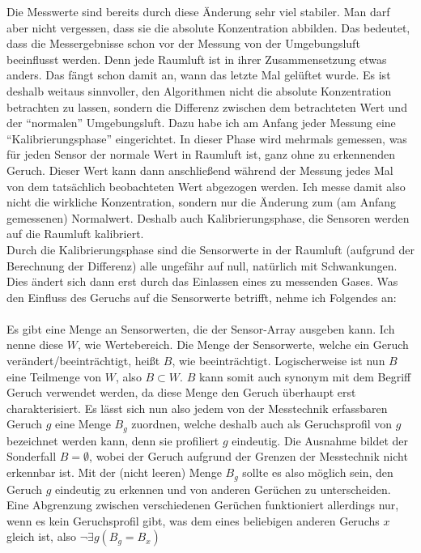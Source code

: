 \documentclass[10pt]{article}
\begin{document}
Die Messwerte sind bereits durch diese Änderung sehr viel stabiler. Man darf aber nicht vergessen, dass sie die absolute Konzentration abbilden.
Das bedeutet, dass die Messergebnisse schon vor der Messung von der Umgebungsluft beeinflusst werden. Denn jede Raumluft ist in ihrer Zusammensetzung etwas anders. Das fängt schon damit an, wann
das letzte Mal gelüftet wurde. Es ist deshalb weitaus sinnvoller, den Algorithmen nicht die absolute Konzentration betrachten zu lassen, sondern die Differenz zwischen dem betrachteten
Wert und der "`normalen"' Umgebungsluft. Dazu habe ich am Anfang jeder Messung eine "`Kalibrierungsphase"' eingerichtet. In dieser Phase wird mehrmals gemessen, was für jeden Sensor
der normale Wert in Raumluft ist, ganz ohne zu erkennenden Geruch. Dieser Wert kann dann anschließend während der Messung jedes Mal von dem tatsächlich beobachteten Wert abgezogen werden. 
Ich messe damit also nicht die wirkliche Konzentration, sondern nur die Änderung zum (am Anfang gemessenen) Normalwert. Deshalb auch Kalibrierungsphase, die Sensoren werden auf die Raumluft 
kalibriert.\\
Durch die Kalibrierungsphase sind die Sensorwerte in der Raumluft (aufgrund der Berechnung der Differenz) alle ungefähr auf null, natürlich mit Schwankungen. Dies ändert sich dann
erst durch das Einlassen eines zu messenden Gases. Was den Einfluss des Geruchs auf die Sensorwerte betrifft, nehme ich Folgendes an:\\
\\
Es gibt eine Menge an Sensorwerten, die der Sensor-Array ausgeben kann. Ich nenne diese $W$, wie Wertebereich.
Die Menge der Sensorwerte, welche ein Geruch verändert/beeinträchtigt, heißt $B$, wie beeinträchtigt.
Logischerweise ist nun $B$ eine Teilmenge von $W$, also $B \subset W$.
$B$ kann somit auch synonym mit dem Begriff Geruch verwendet werden, da diese Menge den Geruch überhaupt erst charakterisiert.
Es lässt sich nun also jedem von der Messtechnik erfassbaren Geruch $g$ eine Menge $B_g$ zuordnen, welche deshalb auch als Geruchsprofil von $g$ bezeichnet werden
kann, denn sie profiliert $g$ eindeutig. Die Ausnahme bildet der Sonderfall $B = \emptyset$, wobei der Geruch aufgrund der Grenzen der Messtechnik nicht erkennbar ist.
Mit der (nicht leeren) Menge $B_g$ sollte es also möglich sein, den Geruch $g$ eindeutig zu erkennen und von anderen Gerüchen zu unterscheiden. 
Eine Abgrenzung zwischen verschiedenen Gerüchen funktioniert allerdings nur, wenn es kein Geruchsprofil gibt, was dem eines beliebigen anderen Geruchs $x$ gleich ist, 
also $\neg \exists g (B_g = B_x)$ \\
\end{document}
